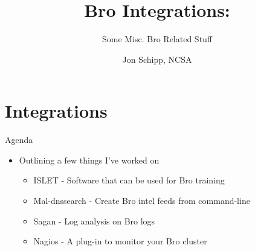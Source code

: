 \documentclass[xcolor=svgnames,handout]{beamer}
\title{Bro Integrations:}
\subtitle{Some Misc. Bro Related Stuff}
\author{Jon Schipp, \small NCSA}
\institute{%
BroCon15 \\
MIT, Cambridge, Massachusetts
}
\date[]{}
\begin{document}
\begin{frame}[plain]
  \titlepage
\end{frame}

\section{Integrations}

\begin{frame}[fragile]{}
  \begin{block}{Agenda}
    \begin{itemize}
      \item Outlining a few things I've worked on
    	\begin{itemize}
      		\item ISLET - Software that can be used for Bro training
      		\item Mal-dnssearch - Create Bro intel feeds from command-line
      		\item Sagan - Log analysis on Bro logs
      		\item Nagios - A plug-in to monitor your Bro cluster
    	\end{itemize}
    \end{itemize}
  \end{block}
\end{frame}
\end{document}
